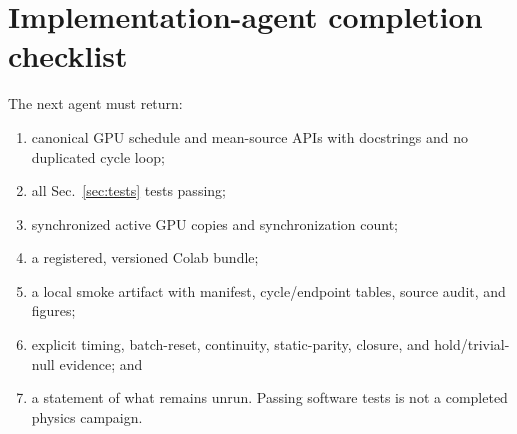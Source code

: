 \documentclass[aps,prb,onecolumn,nofootinbib,superscriptaddress]{revtex4-2}
\begin{document}
\section{Implementation-agent completion checklist}

The next agent must return:
\begin{enumerate}
 \item canonical GPU schedule and mean-source APIs with docstrings and no
 duplicated cycle loop;
 \item all Sec.~\ref{sec:tests} tests passing;
 \item synchronized active GPU copies and synchronization count;
 \item a registered, versioned Colab bundle;
 \item a local smoke artifact with manifest, cycle/endpoint tables, source
 audit, and figures;
 \item explicit timing, batch-reset, continuity, static-parity, closure, and
 hold/trivial-null evidence; and
 \item a statement of what remains unrun.  Passing software tests is not a
 completed physics campaign.
\end{enumerate}



\end{document}
